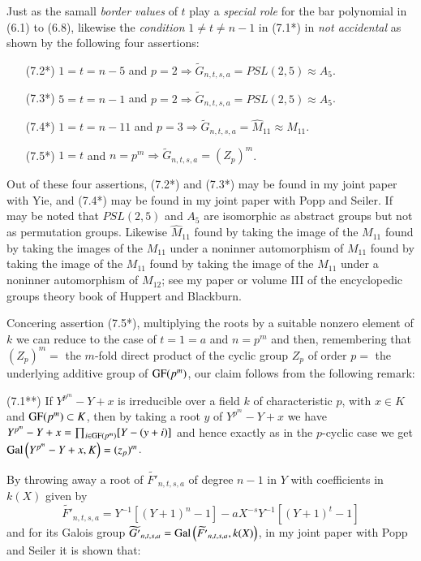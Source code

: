 Just as the samall \textit{border values} of $t$ play a \textit{special role} for the bar polynomial in (6.1) to (6.8), likewise the \textit{condition} $1\neq t \neq n-1$ in (7.1*) in \textit{not accidental} as shown by the following four assertions:
\begin{itemize}
\item[{\rm (7.2*)}] $1 =t =n-5$ and $ p=2\Rightarrow \widetilde{G}_{n,t,s,a} =PSL(2,5) \approx A_{5}$.
\item[{\rm (7.3*)}] $5=t=n-1$ and $ p=2\Rightarrow \widetilde{G}_{n,t,s,a} =PSL(2,5) \approx A_{5}$.
\item[{\rm (7.4*)}] $1=t=n-11$ and $p=3 \Rightarrow \widetilde{G}_{n,t,s,a} = \widehat{M}_{11}\approx M_{11}$.
\item[{\rm (7.5*)}] $1=t$ and $n=p^{m} \Rightarrow \widetilde{G}_{n,t,s,a} =(Z_{p})^m$. 
\end{itemize}

Out of these four assertions, (7.2*) and (7.3*) may be found in my joint paper \cite{chap1-key17} with Yie, and (7.4*) may be found in my joint paper \cite{chap1-key15} with Popp and Seiler. If may be noted that $PSL(2,5)$ and $A_{5}$ are isomorphic as abstract groups but not as permutation groups. Likewise $\widehat{M}_{11}$ found by taking the image of the $M_{11}$ found by taking the images of the $M_{11}$ under a noninner automorphism of $M_{11}$ found by taking the image of the $M_{11}$ found by taking the image of the $M_{11}$ under a noninner automorphism of $M_{12}$; see my paper \cite{chap1-key8} or volume III of the encyclopedic groups theory book \cite{chap1-key36} of Huppert and Blackburn. 

Concering assertion (7.5*), multiplying the roots by a suitable nonzero element of $k$ we can reduce to the case of $t=1=a$ and $n=p^{m}$ and then, remembering that $(Z_{p})^m =$ the $m$-fold direct product of the cyclic group $Z_{p}$ of order $p=$ the underlying additive group of $\operatorname{GF}(p^m)$, our claim follows from the following remark: 

(7.1**) If $Y^{p^{m}}-Y+x$ is irreducible over a field $k$ of characteristic $p$, with $x\in K$ and $\operatorname{GF}(p^m) \subset K$, then by taking a root $y$ of $Y^{p^{m}}-Y+x$ we have $Y^{p^{m}}-Y+x = \prod_{i\in \operatorname{GF}(p^m)}[Y-(y+i)]$ and hence exactly as in the $p$-cyclic case we get $\operatorname{Gal}\left(Y^{p^{m}}-Y +x, K\right) = (z_{p})^m$. 

By throwing away a root of $\widetilde{F'}_{n,t,s,a}$ of degree $n-1$ in $Y$ with coefficients in $k(X)$ given by
$$
\widetilde{F'}_{n,t,s,a} = Y^{-1}\left[(Y+1)^{n} -1\right]- aX^{-s}Y^{-1}\left[(Y+1)^{t}-1\right]
$$
and for its Galois group $\widetilde{G'}_{n,t,s,a} = \operatorname{Gal}\left(\widetilde{F'}_{n,t,s,a}, k(X)\right)$, in my joint paper \cite{chap1-key15} with Popp and Seiler it is shown that:

